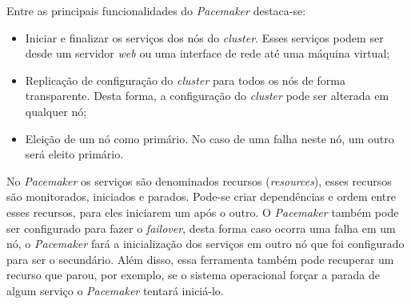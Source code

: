 Entre as principais funcionalidades do \textit{Pacemaker} destaca-se:
\begin{itemize}
 \item Iniciar e finalizar os serviços dos nós do \textit{cluster}. Esses serviços podem ser desde um servidor \textit{web} ou uma interface de 
 rede até uma máquina virtual;
 \item Replicação de configuração do \textit{cluster} para todos os nós de forma transparente. Desta forma, a configuração do \textit{cluster} 
 pode ser alterada em qualquer nó;
 \item Eleição de um nó como primário. No caso de uma falha neste nó, um outro será eleito primário.
\end{itemize}

No \textit{Pacemaker} os serviços são denominados recursos (\textit{resources}), esses recursos são monitorados, iniciados e parados.
Pode-se criar dependências e ordem entre esses recursos, para eles iniciarem um após o outro. O \textit{Pacemaker} também pode ser configurado
para fazer o \textit{failover}, desta forma caso ocorra uma falha em um nó, o \textit{Pacemaker} fará a inicialização dos serviços em outro nó 
que foi configurado para ser o secundário. Além disso, essa ferramenta também pode recuperar um recurso que parou, por exemplo, se o sistema
operacional forçar a parada de algum serviço o \textit{Pacemaker} tentará iniciá-lo.


